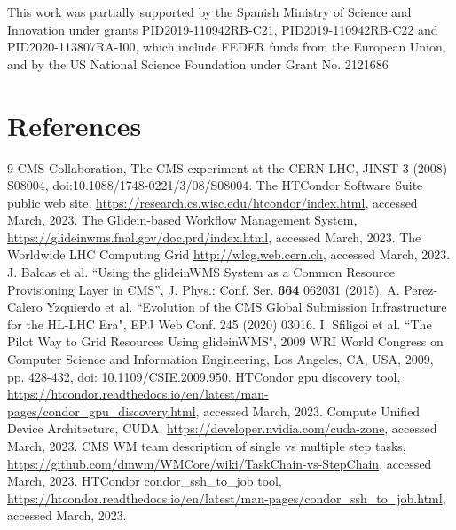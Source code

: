 \documentclass[a4paper]{jpconf}
\begin{document}
\ack
This work was partially supported by the Spanish Ministry of Science and Innovation under grants PID2019-110942RB-C21, PID2019-110942RB-C22 and PID2020-113807RA-I00, which include FEDER funds from the European Union, and by the US National Science Foundation under Grant No. 2121686
 
\section*{References}
\begin{thebibliography}{9}
 CMS Collaboration, The CMS experiment at the CERN LHC, 
JINST 3 (2008) S08004, doi:10.1088/1748-0221/3/08/S08004.
 The HTCondor Software Suite public web site, \url{https://research.cs.wisc.edu/htcondor/index.html}, accessed March, 2023.
 The Glidein-based Workflow Management System, \url{https://glideinwms.fnal.gov/doc.prd/index.html}, accessed March, 2023.
 The Worldwide LHC Computing Grid \url{http://wlcg.web.cern.ch}, accessed March, 2023.
 J. Balcas et al. ``Using the glideinWMS System as a Common Resource Provisioning Layer in CMS'', J. Phys.: Conf. Ser. \textbf{664} 062031 (2015).
 A. Perez-Calero Yzquierdo et al. ``Evolution of the CMS Global Submission Infrastructure for the HL-LHC Era", EPJ Web Conf. 245 (2020) 03016.
 I. Sfiligoi et al. ``The Pilot Way to Grid Resources Using glideinWMS", 2009 WRI World Congress on Computer Science and Information Engineering, Los Angeles, CA, USA, 2009, pp. 428-432, doi: 10.1109/CSIE.2009.950.
 HTCondor gpu discovery tool, \url{https://htcondor.readthedocs.io/en/latest/man-pages/condor_gpu_discovery.html}, accessed March, 2023.
 Compute Unified Device Architecture, CUDA, \url{https://developer.nvidia.com/cuda-zone}, accessed March, 2023.
 CMS WM team description of single vs multiple step tasks, \url{https://github.com/dmwm/WMCore/wiki/TaskChain-vs-StepChain}, accessed March, 2023.
 HTCondor condor\_ssh\_to\_job tool, \url{https://htcondor.readthedocs.io/en/latest/man-pages/condor_ssh_to_job.html}, accessed March, 2023.
\end{thebibliography}
\end{document}
